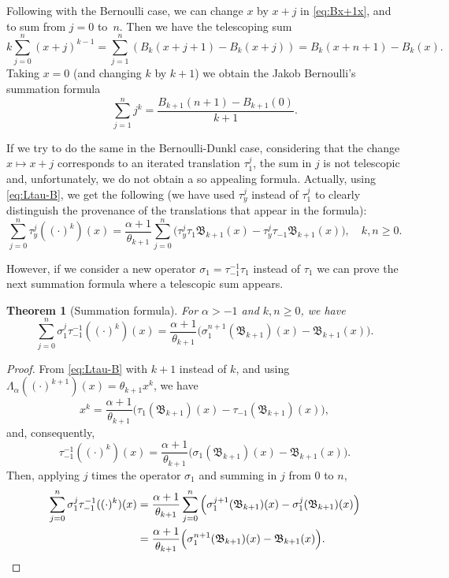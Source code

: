 \documentclass[10pt]{article}
\theoremstyle{plain}
\newtheorem{theorem}{Theorem}[section]
\theoremstyle{definition}
\numberwithin{equation}{section} %
\newcommand{\La}{\Lambda_{\alpha}}
\newcommand{\B}{\mathfrak{B}}
\begin{document}
Following with the Bernoulli case, we can change $x$ by $x+j$ in \eqref{eq:Bx+1x}, and to sum from $j=0$ to~$n$. Then we have the telescoping sum
\[
  k \sum_{j=0}^n (x+j)^{k-1} = \sum_{j=1}^n (B_k(x+j+1) - B_k(x+j)) = B_k(x+n+1) - B_k(x).
\]
Taking $x=0$ (and changing $k$ by $k+1$) we obtain the Jakob Bernoulli's summation formula
\[
  \sum_{j=1}^n j^k = \frac{B_{k+1}(n+1) - B_{k+1}(0)}{k+1}.
\]

If we try to do the same in the Bernoulli-Dunkl case, considering that the change $x \mapsto x+j$ corresponds to an iterated translation $\tau_1^j$, the sum in $j$ is not telescopic and, unfortunately, we do not obtain a so appealing formula.
Actually, using \eqref{eq:Ltau-B}, we get the following (we have used $\tau_y^j$ instead of $\tau_1^j$ to clearly distinguish the provenance of the translations that appear in the formula):
\begin{equation}
\label{eq:summation}
  \sum_{j=0}^n \tau_y^j((\cdot)^k)(x)  
  = \frac{\alpha+1}{\theta_{k+1}} 
  \sum_{j=0}^n \Big( \tau_y^j \tau_1 \B_{k+1}(x) - \tau_y^j \tau_{-1} \B_{k+1}(x) \Big),\quad k, n \ge 0. 
\end{equation}

However, if we consider a new operator  $\sigma_1 = \tau_{-1}^{-1}\tau_{1}$ instead of $\tau_1$ we can prove the next summation formula where a telescopic sum appears.

\begin{theorem}[Summation formula]
\label{teo:summationBs1}
For $\alpha>-1$ and $k,n\ge 0$, we have
\begin{equation}
\label{eq:summationBs1}
  \sum_{j=0}^n \sigma_1^j\tau_{-1}^{-1}((\cdot)^{k})(x)
  = \frac{\alpha+1}{\theta_{k+1}} \Big(\sigma_1^{n+1}(\B_{k+1})(x)-\B_{k+1}(x)\Big).
\end{equation}
\end{theorem}

\begin{proof}
From \eqref{eq:Ltau-B} with $k + 1$ instead of $k$, and using $\La((\cdot)^{k+1})(x) = \theta_{k+1} x^k$, we have 
\[
  x^k = \frac{\alpha+1}{\theta_{k+1}} \big(\tau_1(\B_{k+1})(x)-\tau_{-1}(\B_{k+1})(x)\big),
\]
and, consequently,
\[
  \tau_{-1}^{-1}((\cdot)^{k})(x) = \frac{\alpha+1}{\theta_{k+1}} \big(\sigma_1(\B_{k+1})(x)-\B_{k+1}(x)\big).
\]
Then, applying $j$ times the operator $\sigma_1$ and summing in $j$ from $0$ to $n$,
\begin{align*}
  \sum_{j=0}^n \sigma_1^j \tau_{-1}^{-1}((\cdot)^{k})(x)
  &= \frac{\alpha+1}{\theta_{k+1}} \sum_{j=0}^n \Big(\sigma_1^{j+1}(\B_{k+1})(x)-\sigma_1^j(\B_{k+1})(x)\Big) \\
  &= \frac{\alpha+1}{\theta_{k+1}} \Big(\sigma_1^{n+1}(\B_{k+1})(x)-\B_{k+1}(x)\Big).
\qedhere
\end{align*}
\end{proof}
\end{document}
